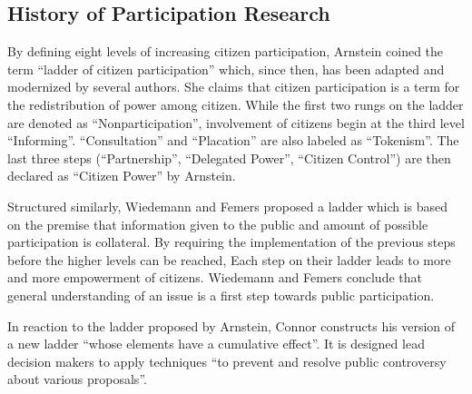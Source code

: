 



\label{chap:related_work}

\subsection{History of Participation Research}
By defining eight levels of increasing citizen participation, Arnstein \cite{Arnstein1969_citizen_participation} coined the term ``ladder of citizen participation'' which, since then, has been adapted and modernized \cite{Connor1988_new_ladder,carver2003future,Collins2009_social_learning,you2009_participatory_map_based,Cai2009_spatial_annotation_deliberation,Macintosh2004_eParticipation_characterization,Schlossberg2005_PPGIS} by several authors. She claims that citizen participation is a term for the redistribution of power among citizen. While the first two rungs on the ladder are denoted as ``Nonparticipation'', involvement of citizens begin at the third level ``Informing''. ``Consultation'' and ``Placation'' are also labeled as ``Tokenism''. The last three steps (``Partnership'', ``Delegated Power'', ``Citizen Control'') are then declared as ``Citizen Power'' by Arnstein.

Structured similarly, Wiedemann and Femers \cite{Wiedemann1993355} proposed a ladder which is based on the premise that information given to the public and amount of possible participation is collateral. By requiring the implementation of the previous steps before the higher levels can be reached, Each step on their ladder leads to more and more empowerment of citizens. Wiedemann and Femers conclude that general understanding of an issue is a first step towards public participation.

In reaction to the ladder proposed by Arnstein, Connor \cite{Connor1988_new_ladder} constructs his version of a new ladder ``whose elements have a cumulative effect''. It is designed lead decision makers to apply techniques ``to prevent and resolve public controversy about various proposals''. %

